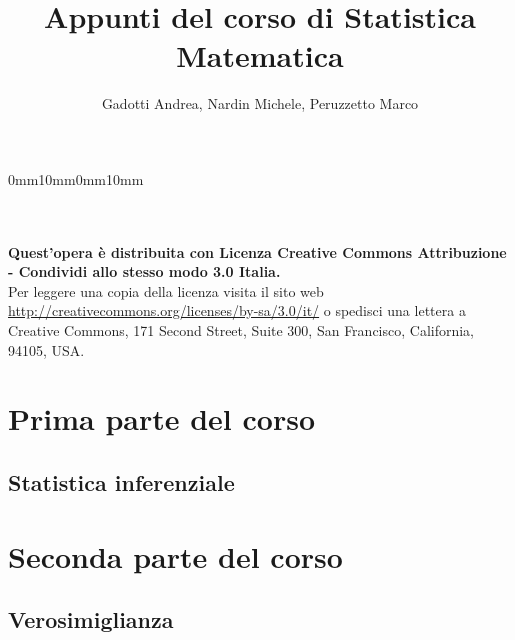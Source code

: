 \documentclass[11pt,a4paper,oneside]{book}
\title{Appunti del corso di Statistica Matematica}
\author{Gadotti Andrea, Nardin Michele, Peruzzetto Marco}
\date{}
\theoremstyle{plain}
\theoremstyle{definition}
\theoremstyle{remark}
\begin{document}
\setmarginsrb{35mm}{20mm}{25mm}{35mm}%
             {0mm}{10mm}{0mm}{10mm}
             
\maketitle

\null
\vfill
\noindent \ccbysa  \\
\\
\textbf{Quest'opera è distribuita con Licenza Creative Commons Attribuzione - Condividi allo stesso modo 3.0 Italia.} \\
Per leggere una copia della licenza visita il sito web \url{http://creativecommons.org/licenses/by-sa/3.0/it/} o spedisci una lettera a Creative Commons, 171 Second
Street, Suite 300, San Francisco, California, 94105, USA.


\newpage
{}

\tableofcontents
\part{Prima parte del corso}




\chapter{Statistica inferenziale}









\part{Seconda parte del corso}
\chapter{Verosimiglianza}










%
\end{document}
